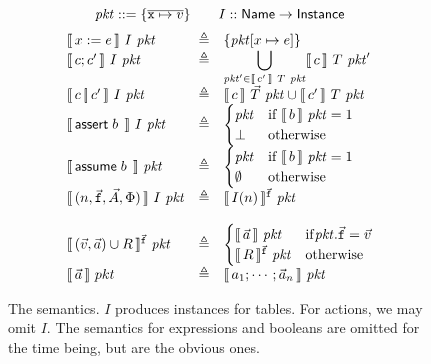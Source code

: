 

\begin{figure}
  \[\mathit{pkt} :: = \{\overline{\texttt{x} \mapsto v}\}\qquad I :: \mathsf{Name} \to \mathsf{Instance}\]
  \[\begin{array}{lcl}
      \llbracket\,x:=e\,\rrbracket~I~\mathit{pkt} &\triangleq& \{\mathit{pkt}[x \mapsto e]\} \\
      \llbracket\,c;c'\,\rrbracket~I~\mathit{pkt} & \triangleq& \displaystyle \bigcup_{\mathit{pkt}' \in \llbracket\,c'\,\rrbracket~T~\mathit{pkt}}\llbracket\,c\,\rrbracket~T~\mathit{pkt}' \\
      \llbracket\,c\operatorname*{\left[\!\right]} c'\,\rrbracket~I~\mathit{pkt} & \triangleq & \llbracket\,c\,\rrbracket~\vec T~\mathit{pkt} \cup \llbracket\,c'\,\rrbracket~T~\mathit{pkt}\\
      \llbracket\,\mathsf{assert}\; b\;\,\rrbracket~I~\mathit{pkt} & \triangleq & \begin{cases}
        \mathit{pkt} & \textrm{if}~\llbracket\,b\,\rrbracket~\mathit{pkt} = 1 \\
        \bot & \textrm{otherwise}
      \end{cases} \\
      \llbracket\,\mathsf{assume}\; b\;\,\rrbracket~\mathit{pkt} & \triangleq & \begin{cases}
        \mathit{pkt} & \textrm{if}~\llbracket\,b\,\rrbracket~\mathit{pkt} = 1 \\
        \emptyset & \textrm{otherwise}
      \end{cases} \\
      \llbracket\,(n,\vec{\texttt{f}}, \vec A, \Phi)\,\rrbracket~I~\mathit{pkt} &\triangleq & \llbracket\,I(n)\,\rrbracket^{\vec{\texttt{f}}}~\mathit{pkt} \\\\
      \llbracket\,(\vec v, \vec a)\cup R\,\rrbracket^{\vec{\texttt{f}}}~\mathit{pkt} & \triangleq & \begin{cases}
        \llbracket\,\vec a\,\rrbracket~\mathit{pkt} & \mathrm{if} \mathit{pkt}.\vec{\texttt{f}} = \vec v\\
        \llbracket\,R\,\rrbracket^{\vec{\texttt{f}}}~\mathit{pkt}& \mathrm{otherwise}
        \end{cases}                                                            
      \\
      \llbracket\,\vec a\,\rrbracket~pkt & \triangleq & \llbracket\,a_1;\cdots;\vec a_n\,\rrbracket~\mathit{pkt}
    \end{array}
  \]

  \caption{The semantics. $I$ produces instances for tables. For
    actions, we may omit $I$. The semantics for expressions and
    booleans are omitted for the time being, but are the obvious
    ones.}
  \label{fig:semantics}
\end{figure}